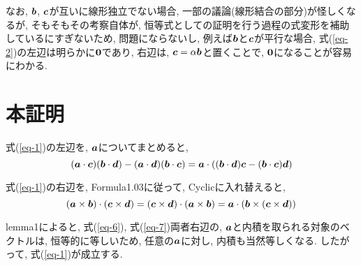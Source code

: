 \documentclass{jsarticle}
\newcommand*{\mbold}[1]{\mbox{\boldmath $#1$}}
\begin{document}
なお, $\mbold{b}$, $\mbold{c}$が互いに線形独立でない場合, 一部の議論(線形結合の部分)が怪しくなるが, 
そもそもその考察自体が, 恒等式としての証明を行う過程の式変形を補助しているにすぎないため, 問題にならないし, 
例えば$\mbold{b}$と$\mbold{c}$が平行な場合, 
式(\ref{eq-2})の左辺は明らかに$\mbold{0}$であり, 右辺は, $\mbold{c} = \alpha \mbold{b}$と置くことで, $\mbold{0}$になることが容易にわかる. 

\section{本証明}
式(\ref{eq-1})の左辺を, $\mbold{a}$についてまとめると, 
\begin{equation}\label{eq-6}
  (\mbold{a} \cdot \mbold{c})(\mbold{b} \cdot \mbold{d}) - (\mbold{a} \cdot \mbold{d})(\mbold{b} \cdot \mbold{c})
  = \mbold{a} \cdot ((\mbold{b} \cdot \mbold{d})\mbold{c} - (\mbold{b} \cdot \mbold{c})\mbold{d})
\end{equation}

式(\ref{eq-1})の右辺を, Formula1.03に従って, Cyclicに入れ替えると, 
\begin{equation}\label{eq-7}
  (\mbold{a} \times \mbold{b}) \cdot (\mbold{c} \times \mbold{d})
  = (\mbold{c} \times \mbold{d}) \cdot (\mbold{a} \times \mbold{b})
  = \mbold{a} \cdot (\mbold{b} \times (\mbold{c} \times \mbold{d}))
\end{equation}

lemma1によると, 式(\ref{eq-6}), 式(\ref{eq-7})両者右辺の, $\mbold{a}$と内積を取られる対象のベクトルは, 
恒等的に等しいため, 任意の$\mbold{a}$に対し, 内積も当然等しくなる. 
したがって, 式(\ref{eq-1})が成立する. 
\end{document}
